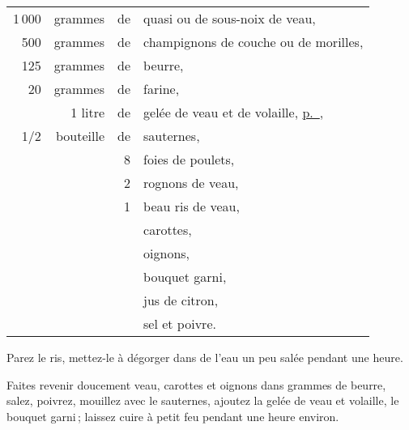 \footnotesize
\begin{longtable}{rrrp{16em}}
  1 000 & grammes & de & quasi ou de sous-noix de veau,                                                   \\
    500 & grammes & de & champignons de couche ou de morilles,                                            \\
    125 & grammes & de & beurre,                                                                          \\
     20 & grammes & de & farine,                                                                          \\
        & 1 litre & de & gelée de veau et de volaille, \hyperlink{p0418}{p. \pageref{pg0418}},            \\
  1/2 & bouteille & de & sauternes,                                                                       \\
        &         & 8 & foies de poulets,                                                                 \\
        &         & 2 & rognons de veau,                                                                  \\
        &         & 1 & beau ris de veau,                                                                 \\
        &         &   & carottes,                                                                         \\
        &         &   & oignons,                                                                          \\
        &         &   & bouquet garni,                                                                    \\
        &         &   & jus de citron,                                                                    \\
        &         &   & sel et poivre.                                                                    \\
\end{longtable}
\normalsize

Parez le ris, mettez-le à dégorger dans de l'eau un peu salée pendant une heure.

Faites revenir doucement veau, carottes et oignons dans {\mmm} grammes de beurre,
salez, poivrez, mouillez avec le sauternes, ajoutez la gelée de veau et
volaille, le bouquet garni ; laissez cuire à petit feu pendant une heure
environ.

